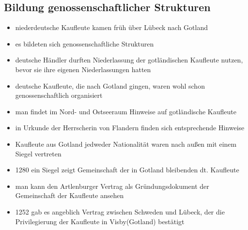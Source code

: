 \documentclass[10pt,a4paper,oneside,ngerman,numbers=noenddot]{scrartcl}
\newenvironment{myitemize}{\begin{itemize}\itemsep -8pt}{\end{itemize}} %
\begin{document}
\subsection*{Bildung genossenschaftlicher Strukturen}
\begin{myitemize}
    \item niederdeutsche Kaufleute kamen früh über Lübeck nach Gotland
    \item es bildeten sich genossenschaftliche Strukturen
    \item deutsche Händler durften Niederlassung der gotländischen Kaufleute nutzen, bevor sie ihre eigenen Niederlassungen hatten
    \item deutsche Kaufleute, die nach Gotland gingen, waren wohl schon genossenschaftlich organisiert
    \item man findet im Nord- und Ostseeraum Hinweise auf gotländische Kaufleute
    \item in Urkunde der Herrscherin von Flandern finden sich entsprechende Hinweise
    \item Kaufleute aus Gotland jedweder Nationalität waren nach außen mit einem Siegel vertreten
    \item 1280 ein Siegel zeigt Gemeinschaft der in Gotland bleibenden dt. Kaufleute
    \item man kann den Artlenburger Vertrag als Gründungsdokument der Gemeinschaft der Kaufleute ansehen
    \item 1252 gab es angeblich Vertrag zwischen Schweden und Lübeck, der die Privilegierung der Kaufleute
          in Visby(Gotland) bestätigt
\end{myitemize}
\end{document}

